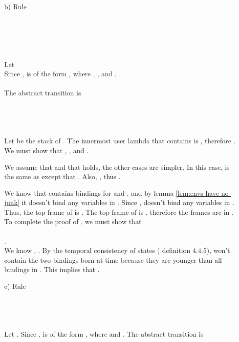 \documentclass{LMCS}
\theoremstyle{definition} \newtheorem{property}[thm]{Property}
\begin{document}
\begin{enumerate}[]
\item[b)]
    Rule  \\
    
    \\
    \\
     \\
      \\
    \\
    Let  \\
    Since , \astat{} is of the form
    , 
    where , ,
     and .
    \\ \\
    The abstract transition is \\
     \\
     \\
     \\
    \\
    Let  be the stack of .
    The innermost user lambda that contains \mcall{} is , therefore 
    .
    We must show that , \ie,
     and .

    We assume that  and that  holds, the 
    other cases are simpler.
    In this case,  is the same as  except that
    .
    Also, , thus .
    
    We know that  contains bindings for  and , and by lemma
    \ref{lem:envs-have-no-junk} it doesn't bind any variables in \bv{\mcall}.
    Since ,  doesn't bind
    any variables in .
    Thus, the top frame of  is 
    .
    The top frame of  is ,
    therefore the frames are in .
    To complete the proof of , we must show that
     \\
     \\
    . \\
    We know ,
    .
    By the temporal consistency of states (\confer{} \cite{diss/07/might/dcfa} 
    definition 4.4.5),  won't contain the two bindings born at time
     because they are younger than all bindings in .
    This implies that .
    \\ 
\item[c)]
    Rule  \\
     \\
     \\
     
    \\ \\
    Let .
    Since , \astat{} is of the form 
    , where 
    and .
    The abstract transition is \\
     

\end{enumerate}
\end{document}
